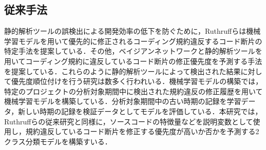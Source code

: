 \documentclass[T,J]{fose} %
\begin{document}







\subsection{従来手法}
静的解析ツールの誤検出による開発効率の低下を防ぐために，Ruthruffらは機械学習モデルを用いて優先的に修正されるコーディング規約違反するコード断片の特定手法を提案している\cite{JyuraiPre}．その他，ベイジアンネットワークと静的解析ツールを用いてコーディング規約に違反しているコード断片の修正優先度を予測する手法を提案している\cite{beizu}．これらのように静的解析ツールによって検出された結果に対して優先度順位付けを行う研究は数多く行われいる．機械学習モデルの構築では，特定のプロジェクトの分析対象期間中に検出された規約違反の修正履歴を用いて機械学習モデルを構築している．分析対象期間中の古い時期の記録を学習データ，新しい時期の記録を検証データとしてモデルを評価している．本研究では，Ruthruffらの従来研究と同様に，ソースコードの特徴量などを説明変数として使用し，規約違反しているコード断片を修正する優先度が高いか否かを予測する2クラス分類モデルを構築すいる．
\end{document}
